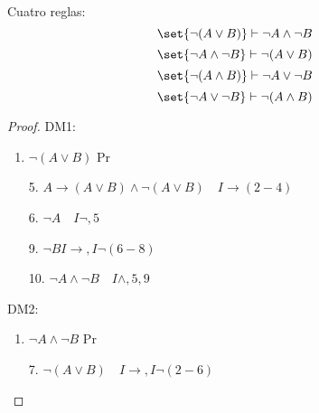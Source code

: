 \begin{theorem}
	Cuatro reglas:
	\[
		\set{\neg(A \vee B)} \vdash \neg A \wedge  \neg B
	\]
	\[
		\set{\neg A \wedge \neg B } \vdash \neg (A \vee B )
	\]
	\[
		\set{\neg(A \wedge B )} \vdash \neg A \vee \neg B
	\]
	\[
		\set{\neg A \vee \neg B } \vdash \neg (A \wedge  B )
	\]
\end{theorem}
\begin{proof}
	DM1:
	\begin{enumerate}
		\item \(\neg (A \vee B )\) Pr
	\end{enumerate}
	\begin{enumerate}
		\item[5.] \(A \to (A \vee B ) \wedge \neg (A \vee B ) \quad I\to(2-4)\)
		\item[6.] \(\neg A \quad I\neg,5 \)
	\end{enumerate}
	\begin{enumerate}
		\item[9.] \(\neg B I\to, I\neg (6-8)\)
		\item[10.] \(\neg A \wedge \neg B \quad I \wedge,5,9\)
	\end{enumerate}

	DM2:
	\begin{enumerate}
		\item \(\neg A \wedge \neg B \) Pr
	\end{enumerate}
	\begin{enumerate}
		\item[7.] \(\neg (A \vee B ) \quad I\to, I\neg (2-6)\)
	\end{enumerate}


\end{proof}
